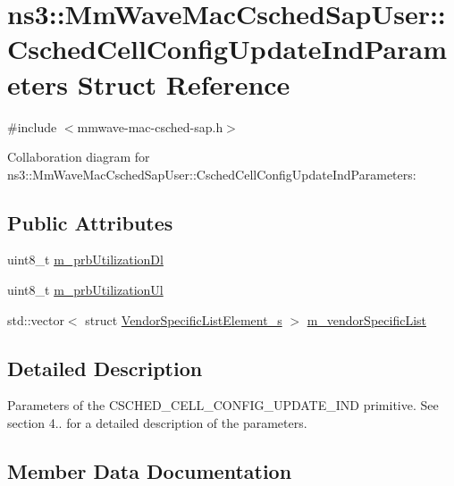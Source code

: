 \hypertarget{structns3_1_1MmWaveMacCschedSapUser_1_1CschedCellConfigUpdateIndParameters}{}\section{ns3\+:\+:Mm\+Wave\+Mac\+Csched\+Sap\+User\+:\+:Csched\+Cell\+Config\+Update\+Ind\+Parameters Struct Reference}
\label{structns3_1_1MmWaveMacCschedSapUser_1_1CschedCellConfigUpdateIndParameters}


{\ttfamily \#include $<$mmwave-\/mac-\/csched-\/sap.\+h$>$}



Collaboration diagram for ns3\+:\+:Mm\+Wave\+Mac\+Csched\+Sap\+User\+:\+:Csched\+Cell\+Config\+Update\+Ind\+Parameters\+:
\subsection*{Public Attributes}
\begin{DoxyCompactItemize}
\item 
uint8\+\_\+t \hyperlink{structns3_1_1MmWaveMacCschedSapUser_1_1CschedCellConfigUpdateIndParameters_a011392b6189a89891a0d260b774e8692}{m\+\_\+prb\+Utilization\+Dl}
\item 
uint8\+\_\+t \hyperlink{structns3_1_1MmWaveMacCschedSapUser_1_1CschedCellConfigUpdateIndParameters_a52b1bd49b16bb3eb578cd8a25f60b904}{m\+\_\+prb\+Utilization\+Ul}
\item 
std\+::vector$<$ struct \hyperlink{structns3_1_1VendorSpecificListElement__s}{Vendor\+Specific\+List\+Element\+\_\+s} $>$ \hyperlink{structns3_1_1MmWaveMacCschedSapUser_1_1CschedCellConfigUpdateIndParameters_ab7440af75efc51ce841b6cf666baa078}{m\+\_\+vendor\+Specific\+List}
\end{DoxyCompactItemize}


\subsection{Detailed Description}
Parameters of the C\+S\+C\+H\+E\+D\+\_\+\+C\+E\+L\+L\+\_\+\+C\+O\+N\+F\+I\+G\+\_\+\+U\+P\+D\+A\+T\+E\+\_\+\+I\+ND primitive. See section 4.. for a detailed description of the parameters. 

\subsection{Member Data Documentation}
